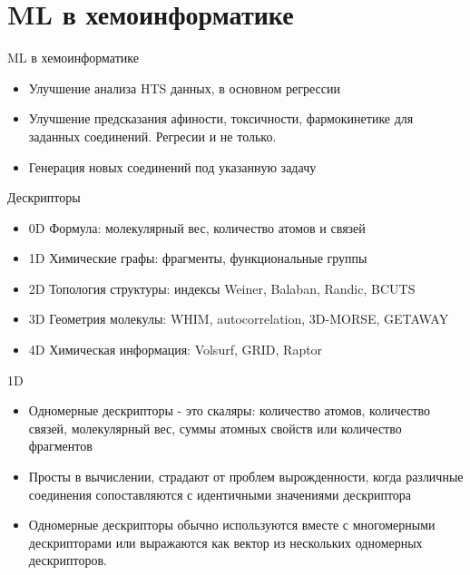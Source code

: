 \begin{frame}[plain]

\end{frame}

\section{ML в  хемоинформатике}
\begin{frame}{ML в  хемоинформатике}
    \begin{itemize}
            \item Улучшение анализа HTS данных, в основном регрессии
            \item Улучшение предсказания  афиности, токсичности, фармокинетике для заданных соединений. Регресии и не только.
            \item Генерация новых  соединений под указанную задачу
        \end{itemize}
\end{frame}

\begin{frame}{Дескрипторы}
    \begin{itemize}
        \item 0D Формула: молекулярный вес, количество атомов и связей
        \item 1D Химические графы: фрагменты, функциональные группы 
        \item 2D Топология структуры: индексы  Weiner, Balaban, Randic, BCUTS
        \item 3D Геометрия молекулы:  WHIM, autocorrelation, 3D-MORSE, GETAWAY
        \item 4D Химическая информация:  Volsurf, GRID, Raptor
        \end{itemize}
\end{frame}


\begin{frame}{1D}
    \begin{itemize}
        \item Одномерные дескрипторы - это скаляры:  количество атомов, количество связей, молекулярный вес, суммы атомных свойств или количество фрагментов
        \item Просты в вычислении, страдают от проблем вырожденности, когда различные соединения сопоставляются с идентичными значениями дескриптора
        \item Одномерные дескрипторы обычно используются вместе с многомерными дескрипторами или выражаются как вектор из нескольких одномерных дескрипторов. 
     \end{itemize}
\end{frame}

